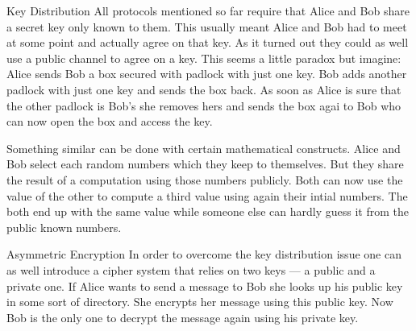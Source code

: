 \documentclass[final,hyperref={pdfpagelabels=false}]{beamer}
\begin{document}
\begin{frame}{}
\begin{columns}[t]
\begin{column}{.32\linewidth}
        \begin{block}{Key Distribution}
          All protocols mentioned so far require that Alice and Bob share a secret key only known to them. This usually meant Alice and Bob had to meet at some point and actually agree on that key. As it turned out they could as well use a public channel to agree on a key.
          This seems a little paradox but imagine: Alice sends Bob a box secured with padlock with just one key. Bob adds another padlock with just one key and sends the box back. As soon as Alice is sure that the other padlock is Bob's she removes hers and sends the box agai to Bob who can now open the box and access the key.  \par
          Something similar can be done with certain mathematical constructs. Alice and Bob select each random numbers which they keep to themselves. But they share the result of a computation using those numbers publicly. Both can now use the value of the other to compute a third value using again their intial numbers. The both end up with the same value while someone else can hardly guess it from the public known numbers. 
        \end{block}
 
        \begin{block}{Asymmetric Encryption}
          In order to overcome the key distribution issue one can as well introduce a cipher system that relies on two keys --- a public and a private one. If Alice wants to send a message to Bob she looks up his public key in some sort of directory. She encrypts her message using this public key. Now Bob is the only one to decrypt the message again using his private key.
        \end{block}


\end{column}
\end{columns}
\end{frame}
\end{document}
